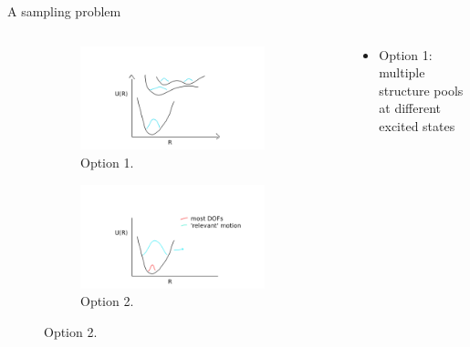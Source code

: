\documentclass{beamer}
\begin{document}
\begin{frame}{A sampling problem}
	\begin{columns}
		\begin{column}{0.5\textwidth}
			\begin{figure}
				\centering
				\begin{subfigure}[b]{\textwidth}
					\centering
					\includegraphics[width=\textwidth, trim= 80 10 58 70, clip]{multi_wigner.png}
					\caption{Option 1.}
					\label{fig:ur}
				\end{subfigure}
				\begin{subfigure}[b]{\textwidth}
					\centering
					\includegraphics[width=\textwidth, trim= 80 10 58 70, clip]{modified_wigner.png}
					\caption{Option 2.}
					\label{fig:ur2}
				\end{subfigure}
			\end{figure}
		\end{column}
		\begin{column}{0.5\textwidth}
			\begin{itemize}
				\item Option 1: multiple structure pools at different excited states

\end{itemize}
\end{column}
\end{columns}
\end{frame}
\end{document}
